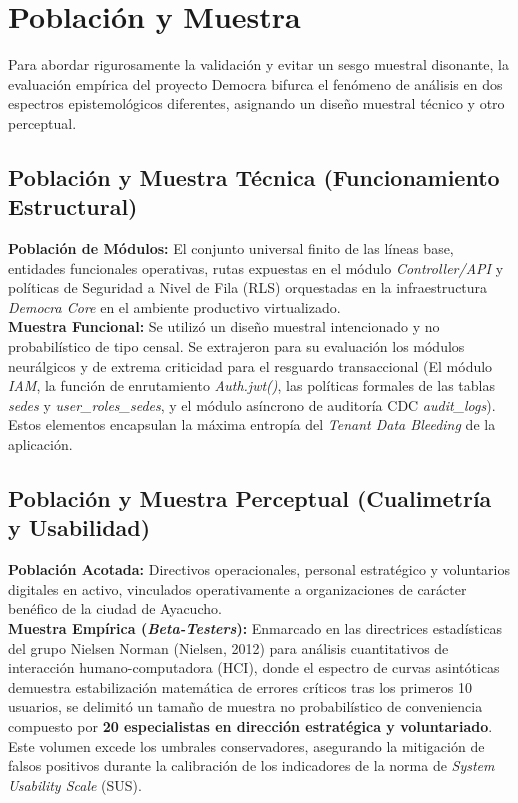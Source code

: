 \documentclass[11pt,a4paper,oneside]{report}
\begin{document}
\section{Poblaci\'on y Muestra}
Para abordar rigurosamente la validaci\'on y evitar un sesgo muestral disonante, la evaluaci\'on emp\'irica del proyecto Democra bifurca el fen\'omeno de an\'alisis en dos espectros epistemol\'ogicos diferentes, asignando un dise\~no muestral t\'ecnico y otro perceptual.

\subsection{Poblaci\'on y Muestra T\'ecnica (Funcionamiento Estructural)}
\textbf{Poblaci\'on de M\'odulos:} El conjunto universal finito de las l\'ineas base, entidades funcionales operativas, rutas expuestas en el m\'odulo \textit{Controller/API} y pol\'iticas de Seguridad a Nivel de Fila (RLS) orquestadas en la infraestructura \textit{Democra Core} en el ambiente productivo virtualizado. \\
\textbf{Muestra Funcional:} Se utiliz\'o un dise\~no muestral intencionado y no probabil\'istico de tipo censal. Se extrajeron para su evaluaci\'on los m\'odulos neur\'algicos y de extrema criticidad para el resguardo transaccional (El m\'odulo \textit{IAM}, la funci\'on de enrutamiento \textit{Auth.jwt()}, las pol\'iticas formales de las tablas \textit{sedes} y \textit{user\_roles\_sedes}, y el m\'odulo as\'incrono de auditor\'ia CDC \textit{audit\_logs}). Estos elementos encapsulan la m\'axima entrop\'ia del \textit{Tenant Data Bleeding} de la aplicaci\'on.

\subsection{Poblaci\'on y Muestra Perceptual (Cualimetr\'ia y Usabilidad)}
\textbf{Poblaci\'on Acotada:} Directivos operacionales, personal estrat\'egico y voluntarios digitales en activo, vinculados operativamente a organizaciones de car\'acter ben\'efico de la ciudad de Ayacucho. \\
\textbf{Muestra Emp\'irica (\textit{Beta-Testers}):} Enmarcado en las directrices estad\'isticas del grupo Nielsen Norman (Nielsen, 2012) para an\'alisis cuantitativos de interacci\'on humano-computadora (HCI), donde el espectro de curvas asint\'oticas demuestra estabilizaci\'on matem\'atica de errores cr\'iticos tras los primeros 10 usuarios, se delimit\'o un tama\~no de muestra no probabil\'istico de conveniencia compuesto por \textbf{20 especialistas en direcci\'on estrat\'egica y voluntariado}. Este volumen excede los umbrales conservadores, asegurando la mitigaci\'on de falsos positivos durante la calibraci\'on de los indicadores de la norma de \textit{System Usability Scale} (SUS).
\end{document}
